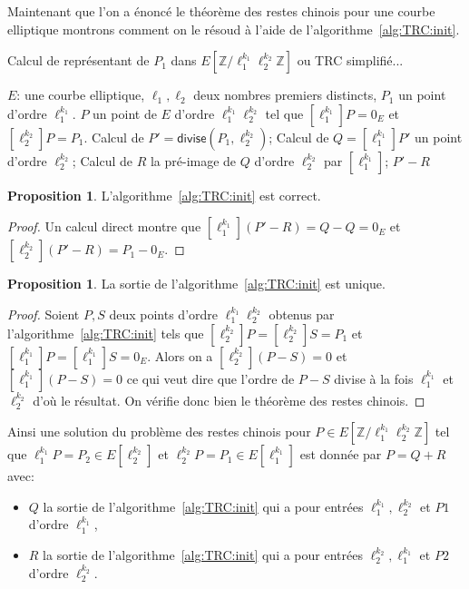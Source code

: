 \documentclass[10pt,a4paper]{book}
\theoremstyle{plain}
\theoremstyle{definition}
\theoremstyle{definition}
\theoremstyle{definition}
\newtheorem{prop}[thm]{Proposition}
\theoremstyle{definition}
\theoremstyle{remark}
\theoremstyle{remark}
\theoremstyle{definition}
\begin{document}
Maintenant que l'on a énoncé le théorème des restes chinois pour une courbe elliptique montrons comment on le résoud à l'aide de l'algorithme~\ref{alg:TRC:init}.
\begin{algorithm}
\caption{\label{alg:TRC:init}Calcul de  représentant de $P_1$ dans $E[\mathbb{Z}/\ell_1^{k_1}\ell_2^{k_2}\mathbb{Z}]$ ou TRC simplifié...}
\begin{algorithmic}[1]
\REQUIRE $E$: une courbe elliptique, $\ell_1,\ell_2$ deux nombres premiers distincts, $P_1$ un point d'ordre $\ell_1^{k_1}$.
\ENSURE $P$ un point de $E$ d'ordre $\ell_1^{k_1}\ell_2^{k_2}$  tel que $[\ell_1^{k_1}]P=0_E$ et $[\ell_2^{k_2}]P=P_1$.
\STATE \label{alg:TRC:init:div} Calcul de $P'=\mathsf{divise}(P_1,\ell_2^{k_2})$;
\STATE \label{alg:TRC:init:mul} Calcul de $Q=[\ell_1^{k_1}]P'$ un point d'ordre $\ell_2^{k_2}$;
\STATE \label{alg:TRC:init:prim} Calcul de $R$ la pré-image de $Q$ d'ordre $\ell_2^{k_2}$ par $[\ell_1^{k_1}]$;
\RETURN $P'-R$
\end{algorithmic}
\end{algorithm}

\begin{prop}
L'algorithme~\ref{alg:TRC:init} est correct.
\end{prop}

\begin{proof}
Un calcul direct montre que $[\ell_1^{k_1}](P'-R)=Q-Q=0_E$ et 
 $[\ell_2^{k_2}](P'-R)=P_1-0_E$.
\end{proof}

\begin{prop}
La sortie de l'algorithme~\ref{alg:TRC:init} est unique.
\end{prop}

\begin{proof}
Soient $P,S$ deux points d'ordre $\ell_1^{k_1}\ell_2^{k_2}$  obtenus par 
l'algorithme~\ref{alg:TRC:init}  tels que 
$[\ell_2^{k_2}]P=[\ell_2^{k_2}]S=P_1$ et  
$[\ell_1^{k_1}]P=[\ell_1^{k_1}]S=0_E$. Alors on a $[\ell_2^{k_2}](P-S)=0$ et 
$[\ell_1^{k_1}](P-S)=0$ ce qui veut dire que l'ordre de $P-S$ divise à la fois 
$\ell_1^{k_1}$ et $\ell_2^{k_2}$ d'où le résultat. On vérifie donc bien le 
théorème des restes chinois.
\end{proof}

Ainsi une solution du problème des restes chinois pour $P \in E[\mathbb{Z}/
\ell_1^{k_1} \ell_2^{k_2}\mathbb{Z}]$ tel que $\ell_1^{k_1}P=P_2 \in 
E[\ell_2^{k_2}]$ et $\ell_2^{k_2}P=P_1 \in E[\ell_1^{k_1}]$ est donnée par 
$P=Q+R$ avec:
\begin{itemize}
\item $Q$ la sortie de l'algorithme~\ref{alg:TRC:init} qui a pour entrées
$\ell_1^{k_1}, \ell_2^{k_2}$ et $P1$ d'ordre $\ell_1^{k_1}$,
\item  $R$ la sortie de l'algorithme~\ref{alg:TRC:init} qui a pour entrées
$\ell_2^{k_2}, \ell_1^{k_1}$ et $P2$ d'ordre $\ell_2^{k_2}$.
\end{itemize}
\end{document}

